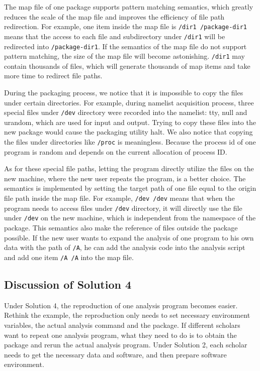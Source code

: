 \documentclass{sig-alternate}
\begin{document}
The map file of one package supports pattern matching semantics,
which greatly reduces the scale of the map file and improves the efficiency of file path redirection. 
For example,
one item inside the map file is {\tt /dir1 /package-dir1} means that the access to each file and
subdirectory under {\tt /dir1} will be redirected into {\tt /package-dir1}.
If the semantics of the map file do not support pattern matching, the size of the map file will become astonishing. 
{\tt /dir1} may contain thousands of files, which will generate thousands of map items and take more time to redirect file paths.

During the packaging process, we notice
that it is impossible to copy the files under certain directories.
For example, during namelist acquisition process, three special files under {\tt /dev} directory were recorded into the namelist: tty, null and urandom, which are used for input and output.
Trying to copy these files into the new package would cause the packaging utility halt.
We also notice that copying the files under directories like {\tt /proc} is
meaningless. Because the process id of one program is random and depends on the
current allocation of process ID. 

As for these special file paths, letting
the program directly utilize the files on the new machine, where the new user
repeats the program, is a better choice. The semantics is implemented by
setting the target path of one file equal to the origin file path inside the
map file. For example, {\tt /dev /dev} means that when the program needs to access
files under {\tt /dev} directory, it will directly use the file under {\tt /dev} on the new machine, which is
independent from the namespace of the package. This semantics also make the
reference of files outside the package possible. If the new user wants to
expand the analysis of one program to his own data with the path of {\tt /A}, he can add the analysis
code into the analysis script and add one item {\tt /A /A} into the map file.


\subsection{Discussion of Solution 4} 

Under Solution 4, the reproduction of one analysis program becomes easier.
Rethink the example, the reproduction only needs
to set necessary environment variables, the actual analysis command
and the package. If different scholars want to repeat one analysis program,
what they need to do is to obtain the package and rerun the actual analysis
program. Under Solution 2, each scholar needs to get the necessary data and
software, and then prepare software environment. 
\end{document}
